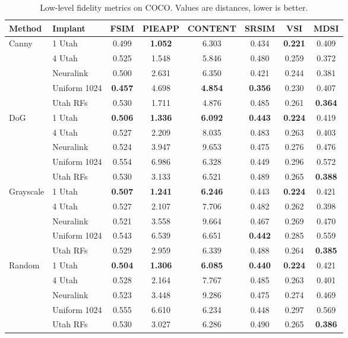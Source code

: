 \begin{table}[t]
\centering
\small
\caption{Low-level fidelity metrics on COCO. Values are distances, lower is better.}
\label{tab:low_coco}
\begin{tabular}{llcccccc}
\toprule
Method & Implant & FSIM & PIEAPP & CONTENT & SRSIM & VSI & MDSI \\
\midrule
Canny & 1 Utah & 0.499 & \textbf{1.052} & 6.303 & 0.434 & \textbf{0.221} & 0.409 \\
 & 4 Utah & 0.525 & 1.548 & 5.846 & 0.480 & 0.259 & 0.372 \\
 & Neuralink & 0.500 & 2.631 & 6.350 & 0.421 & 0.244 & 0.381 \\
 & Uniform 1024 & \textbf{0.457} & 4.698 & \textbf{4.854} & \textbf{0.356} & 0.230 & 0.407 \\
 & Utah RFs & 0.530 & 1.711 & 4.876 & 0.485 & 0.261 & \textbf{0.364} \\
\midrule
DoG & 1 Utah & \textbf{0.506} & \textbf{1.336} & \textbf{6.092} & \textbf{0.443} & \textbf{0.224} & 0.419 \\
 & 4 Utah & 0.527 & 2.209 & 8.035 & 0.483 & 0.263 & 0.403 \\
 & Neuralink & 0.524 & 3.947 & 9.653 & 0.475 & 0.276 & 0.476 \\
 & Uniform 1024 & 0.554 & 6.986 & 6.328 & 0.449 & 0.296 & 0.572 \\
 & Utah RFs & 0.530 & 3.133 & 6.521 & 0.489 & 0.265 & \textbf{0.388} \\
\midrule
Grayscale & 1 Utah & \textbf{0.507} & \textbf{1.241} & \textbf{6.246} & 0.443 & \textbf{0.224} & 0.421 \\
 & 4 Utah & 0.527 & 2.107 & 7.706 & 0.482 & 0.262 & 0.398 \\
 & Neuralink & 0.521 & 3.558 & 9.664 & 0.467 & 0.269 & 0.470 \\
 & Uniform 1024 & 0.543 & 6.539 & 6.651 & \textbf{0.442} & 0.285 & 0.559 \\
 & Utah RFs & 0.529 & 2.959 & 6.339 & 0.488 & 0.264 & \textbf{0.385} \\
\midrule
Random & 1 Utah & \textbf{0.504} & \textbf{1.306} & \textbf{6.085} & \textbf{0.440} & \textbf{0.224} & 0.421 \\
 & 4 Utah & 0.528 & 2.164 & 7.767 & 0.485 & 0.263 & 0.401 \\
 & Neuralink & 0.523 & 3.448 & 9.286 & 0.475 & 0.274 & 0.469 \\
 & Uniform 1024 & 0.555 & 6.610 & 6.234 & 0.448 & 0.297 & 0.569 \\
 & Utah RFs & 0.530 & 3.027 & 6.286 & 0.490 & 0.265 & \textbf{0.386} \\
\midrule
\bottomrule
\end{tabular}
\end{table}